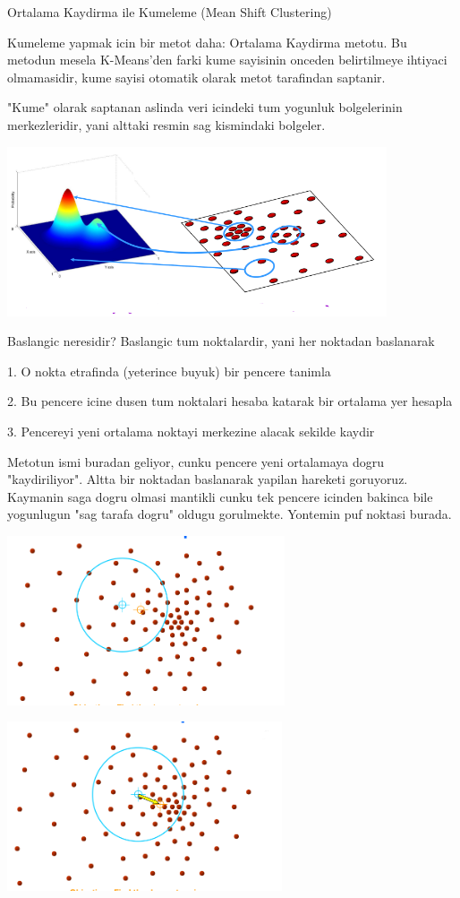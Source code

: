 \documentclass[12pt,fleqn]{article}\usepackage{../common}
\begin{document}
Ortalama Kaydirma ile Kumeleme (Mean Shift Clustering)

Kumeleme yapmak icin bir metot daha: Ortalama Kaydirma metotu. Bu
metodun mesela K-Means'den farki kume sayisinin onceden belirtilmeye
ihtiyaci olmamasidir, kume sayisi otomatik olarak metot tarafindan
saptanir.

"Kume" olarak saptanan aslinda veri icindeki tum yogunluk bolgelerinin
merkezleridir, yani alttaki resmin sag kismindaki bolgeler. 

\includegraphics[height=5cm]{dist.png}

Baslangic neresidir? Baslangic tum noktalardir, yani her noktadan
baslanarak

1. O nokta etrafinda (yeterince buyuk) bir pencere tanimla

2. Bu pencere icine dusen tum noktalari hesaba katarak bir ortalama yer hesapla

3. Pencereyi yeni ortalama noktayi merkezine alacak sekilde kaydir

Metotun ismi buradan geliyor, cunku pencere yeni ortalamaya dogru
"kaydiriliyor". Altta bir noktadan baslanarak yapilan hareketi
goruyoruz.  Kaymanin saga dogru olmasi mantikli cunku tek pencere
icinden bakinca bile yogunlugun "sag tarafa dogru" oldugu
gorulmekte. Yontemin puf noktasi burada.

\includegraphics[height=5cm]{mean_2.png}

\includegraphics[height=5cm]{mean_3.png}
\end{document}
